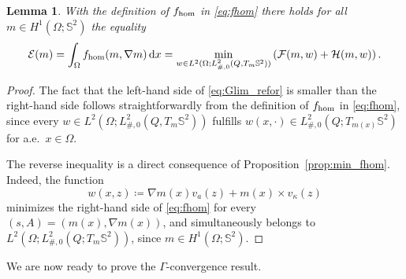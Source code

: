 \documentclass[reqno,11pt]{amsart}
\numberwithin{equation}{section}
\theoremstyle{thmlemcorr}
\numberwithin{theorem}{section}
\newtheorem{lemma}[theorem]{Lemma}
\theoremstyle{thmlemcorr*}
\theoremstyle{defi}
\theoremstyle{remexample}
\theoremstyle{ass}
\renewcommand{\S}{\mathbb{S}}
\newcommand{\Ecal}{\mathcal{E}}
\newcommand{\dd}{\,\mathrm{d}}
\newcommand{\1}{\mathds{1}}
\newcommand{\Om}{\Omega}
\begin{document}
\begin{lemma}\label{lem:Glim_refor}
    With the definition of \(f_{\rm hom}\) in \eqref{eq:fhom} there holds for all \(m \in H^1(\Omega;\S^2)\) the equality
    \begin{align}\label{eq:Glim_refor}
    \begin{split}
        \Ecal(m)=\int_{\Omega}f_{\rm hom}(m,\nabla m)\dd x
        = \min_{w\in  L^2(\Om;L^2_{\#,0}(Q,T_{m}\S^2))}
        \left(\mathcal{F}(m,w) + \mathcal{H}(m,w)\right).
    \end{split}
    \end{align}
\end{lemma}
\begin{proof}
   The fact that the left-hand side of \eqref{eq:Glim_refor} is smaller than the right-hand side follows straightforwardly from the definition of \(f_{\rm hom}\) in \eqref{eq:fhom}, since every \(w\in L^2(\Om;L^2_{\#,0}(Q,T_{m}\S^2))\) fulfills \(w(x,\cdot)\in L^2_{\#,0}(Q;T_{m(x)} \S^2)\) for a.e.~\(x\in \Om\). 

   The reverse inequality is a direct consequence of Proposition~\ref{prop:min_fhom}. Indeed, the function $$ w(x,z)\coloneqq \nabla m(x) v_a(z) +m(x)\times v_\kappa(z) $$ minimizes the right-hand side of \eqref{eq:fhom} for every \((s,A)=(m(x),\nabla m(x))\), and simultaneously belongs to \(L^2(\Om;L^2_{\#,0}(Q;T_m\S^2))\), since \(m\in H^1(\Om;\S^2)\).
\end{proof}
We are now ready to prove the $\Gamma$-convergence result.
\end{document}
